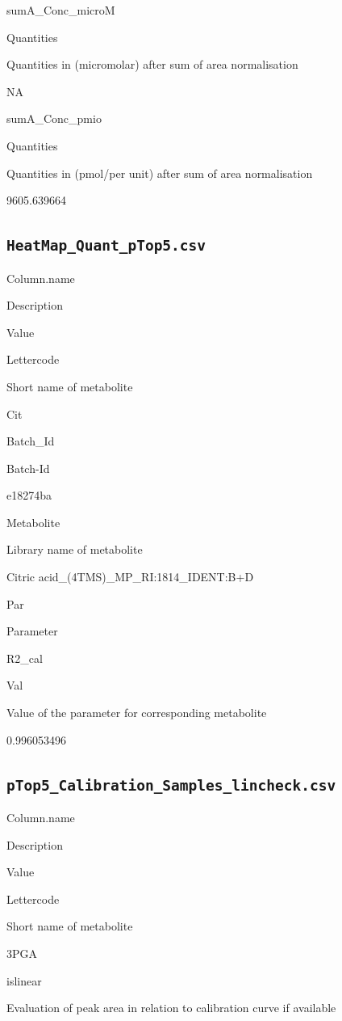 \documentclass[]{book}
\theoremstyle{definition}
\theoremstyle{definition}
\theoremstyle{definition}
\theoremstyle{remark}
\begin{document}
sumA\_Conc\_microM

Quantities

Quantities in (micromolar) after sum of area normalisation

NA

sumA\_Conc\_pmio

Quantities

Quantities in (pmol/per unit) after sum of area normalisation

9605.639664

\subsection{\texorpdfstring{\texttt{HeatMap\_Quant\_pTop5.csv}}{HeatMap\_Quant\_pTop5.csv}}\label{heatmap_quant_ptop5.csv}

Column.name

Description

Value

Lettercode

Short name of metabolite

Cit

Batch\_Id

Batch-Id

e18274ba

Metabolite

Library name of metabolite

Citric acid\_(4TMS)\_MP\_RI:1814\_IDENT:B+D

Par

Parameter

R2\_cal

Val

Value of the parameter for corresponding metabolite

0.996053496

\subsection{\texorpdfstring{\texttt{pTop5\_Calibration\_Samples\_lincheck.csv}}{pTop5\_Calibration\_Samples\_lincheck.csv}}\label{ptop5_calibration_samples_lincheck.csv}

Column.name

Description

Value

Lettercode

Short name of metabolite

3PGA

islinear

Evaluation of peak area in relation to calibration curve if available
\end{document}
